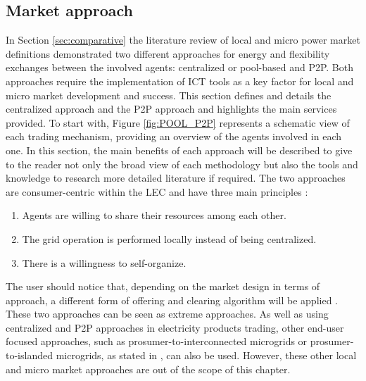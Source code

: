 \newpage
\subsection{Market approach} \label{sec:marketapproach}

In Section \ref{sec:comparative} the literature review of local and micro power market definitions demonstrated two different
approaches for energy and flexibility exchanges between the involved agents: centralized or pool-based and P2P. Both approaches require the implementation of ICT tools as a key factor for local and micro market development and success. This section defines and details the centralized approach and the P2P approach and highlights the main services provided. To start with, Figure \ref{fig:POOL_P2P} represents a schematic view of each trading mechanism, providing an overview of the agents involved in each one. In this section, the main benefits of each approach will be described to give to the reader not only the broad view of each methodology but also the tools and knowledge to research more detailed literature if required. The two approaches are consumer-centric within the LEC and have three main principles \cite{sousa2018peer}:

\begin{enumerate}
\item Agents are willing to share their resources among each other.
\item The grid operation is performed locally instead of being centralized.
\item There is a willingness to self-organize.
\end{enumerate}

The user should notice that, depending on the market design in terms of approach, a different form of offering and clearing algorithm will be applied \cite{Pinson2017}. These two approaches can be seen as extreme approaches. As well as using centralized and P2P approaches in electricity products trading, other end-user focused approaches, such as prosumer-to-interconnected microgrids or prosumer-to-islanded microgrids, as stated in \cite{parag2016electricity}, can also be used. However, these other local and micro market approaches are out of the scope of this chapter.

